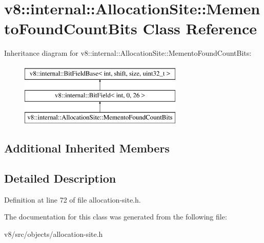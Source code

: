 \hypertarget{classv8_1_1internal_1_1AllocationSite_1_1MementoFoundCountBits}{}\section{v8\+:\+:internal\+:\+:Allocation\+Site\+:\+:Memento\+Found\+Count\+Bits Class Reference}
\label{classv8_1_1internal_1_1AllocationSite_1_1MementoFoundCountBits}
Inheritance diagram for v8\+:\+:internal\+:\+:Allocation\+Site\+:\+:Memento\+Found\+Count\+Bits\+:\begin{figure}[H]
\begin{center}
\leavevmode
\includegraphics[height=3.000000cm]{classv8_1_1internal_1_1AllocationSite_1_1MementoFoundCountBits}
\end{center}
\end{figure}
\subsection*{Additional Inherited Members}


\subsection{Detailed Description}


Definition at line 72 of file allocation-\/site.\+h.



The documentation for this class was generated from the following file\+:\begin{DoxyCompactItemize}
\item 
v8/src/objects/allocation-\/site.\+h\end{DoxyCompactItemize}
